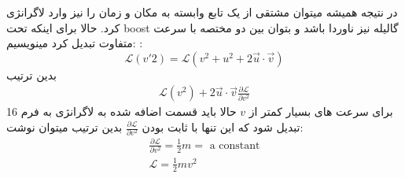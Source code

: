 \documentclass[9pt,a4paper, twocolumn]{article}
\newcommand{\curveL}{\mathcal{L}}
\begin{document}
            در نتیجه همیشه میتوان مشتقی از یک تابع وابسته به مکان و زمان را نیز وارد لاگرانژی کرد.
            حالا برای اینکه تحت boost گالیله نیز ناوردا باشد و بتوان بین دو مختصه با سرعت متفاوت تبدیل کرد مینویسیم: :
            \begin{equation}
                \curveL(v'2) = \curveL(v^2 + u^2 + 2\vec u\cdot \vec v)
            \end{equation}
            بدین ترتیب
            \begin{align}
                \curveL(v^2) + 2\vec u\cdot\vec v \frac{\partial \curveL}{\partial v^2}
            \end{align}
            برای سرعت های بسیار کمتر از $v$ حالا باید قسمت اضافه شده به لاگرانژی به فرم 16 تبدیل شود که این تنها با ثابت بودن $\frac{\partial \curveL}{\partial v^2}$ بدین ترتیب میتوان نوشت:
            \begin{align}
                \frac{\partial \curveL}{\partial v^2} = \frac12 m = \text{ a constant}\\
                \curveL = \frac12 mv^2 
            \end{align}
                

        
\end{document}
